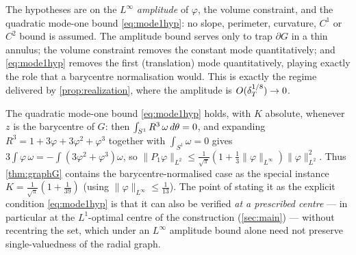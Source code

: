 \begin{remark}\label{rem:noslope}
The hypotheses are on the $L^\infty$ \emph{amplitude} of $\varphi$, the
volume constraint, and the quadratic mode-one bound \eqref{eq:mode1hyp}: no
slope, perimeter, curvature, $C^1$ or $C^2$ bound is assumed. The amplitude
bound serves only to trap $\partial G$ in a thin annulus; the volume
constraint removes the constant mode quantitatively; and \eqref{eq:mode1hyp}
removes the first (translation) mode quantitatively, playing exactly the role
that a barycentre normalisation would. This is exactly the regime delivered
by \cref{prop:realization}, where the amplitude is $O(\delta_T^{1/8})\to0$.
\end{remark}

\begin{remark}\label{rem:mode1}
The quadratic mode-one bound \eqref{eq:mode1hyp} holds, with $K$ absolute,
whenever $z$ is the barycentre of $G$: then $\int_{S^1}R^3\,\omega\,d\theta=0$,
and expanding $R^3=1+3\varphi+3\varphi^2+\varphi^3$ together with
$\int_{S^1}\omega=0$ gives
$3\int\varphi\,\omega=-\int(3\varphi^2+\varphi^3)\omega$, so
$\|P_1\varphi\|_{L^2}\le\tfrac1{\sqrt\pi}(1+\tfrac13\|\varphi\|_{L^\infty})
\|\varphi\|_{L^2}^2$. Thus \cref{thm:graphG} contains the
barycentre-normalised case as the special instance
$K=\tfrac1{\sqrt\pi}(1+\tfrac1{39})$ \textup{(}using
$\|\varphi\|_{L^\infty}\le\tfrac1{13}$\textup{)}. The point of stating it as the
explicit condition \eqref{eq:mode1hyp} is that it can also be verified
\emph{at a prescribed centre} --- in particular at the $L^1$-optimal centre
of the construction (\cref{sec:main}) --- without recentring the set, which
under an $L^\infty$ amplitude bound alone need not preserve single-valuedness
of the radial graph.
\end{remark}

